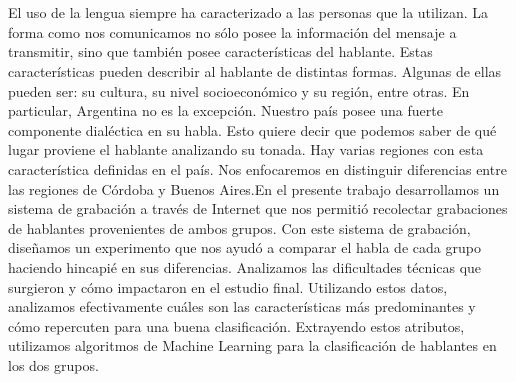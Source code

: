 \chapter*{\runtitulo}

\noindent 

El uso de la lengua siempre ha caracterizado a las personas que la utilizan. La forma como nos comunicamos no sólo posee la información del mensaje a transmitir, sino que también posee características del hablante. Estas características pueden describir al hablante de distintas formas. Algunas de ellas pueden ser: su cultura, su nivel socioeconómico y su región, entre otras. En particular, Argentina no es la excepción. Nuestro país posee una fuerte componente dialéctica en su habla. Esto quiere decir que podemos saber de qué lugar proviene el hablante analizando su tonada. Hay varias regiones con esta característica definidas en el país. Nos enfocaremos en distinguir diferencias entre las regiones de Córdoba y Buenos Aires.En el presente trabajo desarrollamos un sistema de grabación a través de Internet que nos permitió recolectar grabaciones de hablantes provenientes de ambos grupos. Con este sistema de grabación, diseñamos un experimento que nos ayudó a comparar el habla de cada grupo haciendo hincapié en sus diferencias. Analizamos las dificultades técnicas que surgieron y cómo impactaron en el estudio final. Utilizando estos datos, analizamos efectivamente cuáles son las características más predominantes y cómo repercuten para una buena clasificación. Extrayendo estos atributos, utilizamos algoritmos de Machine Learning para la clasificación de hablantes en los dos grupos. 




